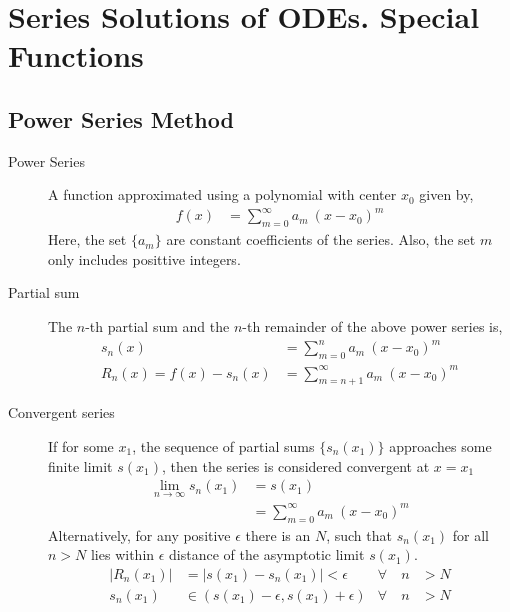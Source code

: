 \chapter{Series Solutions of ODEs. Special Functions}
\section{Power Series Method}
\begin{description}
    \item[Power Series] A function approximated using a polynomial
        with center $ x_0 $ given by,
        \begin{align}
            f(x) & = \sum_{m = 0}^{\infty} a_m\ (x - x_0)^{m}
        \end{align}
        Here, the set $ \{a_m\} $ are constant coefficients of the series. Also,
        the set $ m $ only includes posittive integers.
    \item[Partial sum] The $ n $-th partial sum and the $ n $-th remainder of
        the above power series is,
        \begin{align}
            s_n(x)                 & = \sum_{m = 0}^{n} a_m\ (x - x_0)^{m}        \\
            R_n(x) = f(x) - s_n(x) & = \sum_{m = n+1}^{\infty} a_m\ (x - x_0)^{m}
        \end{align}
    \item[Convergent series] If for some $ x_1 $, the sequence of partial sums
        $ \{s_n(x_1)\} $ approaches some finite limit $ s(x_1) $, then the series is
        considered convergent at $ x = x_1 $
        \begin{align}
            \lim_{n \rightarrow \infty}
            s_n(x_1) & = s(x_1)                                  \\
                     & = \sum_{m = 0}^{\infty}a_m\ (x - x_0)^{m}
        \end{align}
        Alternatively, for any positive $ \epsilon $ there is an $ N $, such that
        $ s_n(x_1) $ for all $ n > N $ lies within $ \epsilon $ distance of the
        asymptotic limit $ s(x_1) $.
        \begin{align}
            |R_n(x_1)|      & = |s(x_1) - s_n(x_1)| < \epsilon           &
            \forall \quad n & > N                                          \\
            s_n(x_1)        & \in (s(x_1) - \epsilon, s(x_1) + \epsilon) &
            \forall \quad n & > N
        \end{align}

\end{description}
